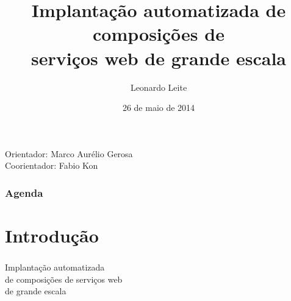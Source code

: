 \documentclass{beamer}
\title[Defesa mestrado]{Implantação automatizada de composições de \\ serviços web de grande escala} %
\author{Leonardo Leite} %
\institute[IME - USP] %
{
IME - USP \\ %
\medskip
}
\date{26 de maio de 2014} %
\begin{document}
\begin{frame}
\titlepage %
\begin{center}
{\scriptsize
Orientador: Marco Aurélio Gerosa \\
Coorientador: Fabio Kon
}
\end{center}
\end{frame}

\begin{frame}
\frametitle{Agenda} %
\tableofcontents %
\end{frame}


\section{Introdução} %


\begin{frame}
\frametitle{}
\begin{center}
\huge
Implantação automatizada \\ de composições de serviços web \\ de grande escala
\end{center}
\end{frame}
\end{document}
